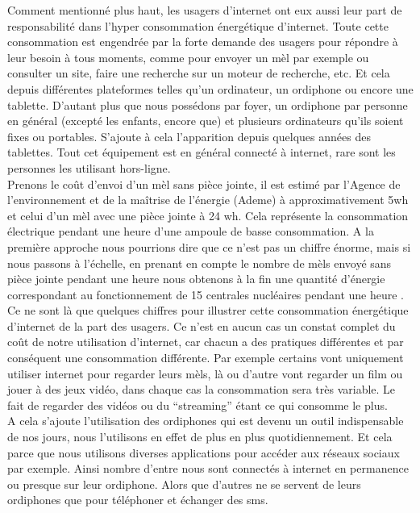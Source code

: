 \documentclass[a4paper,twocolumn,12pt]{article}
\begin{document}
	Comment mentionné plus haut, les usagers d’internet ont eux aussi leur part de responsabilité dans l'hyper consommation énergétique d’internet. Toute cette consommation est engendrée par la forte demande des usagers pour répondre à leur besoin à tous moments, comme pour envoyer un mèl par exemple ou consulter un site, faire une recherche sur un moteur de recherche, etc. Et cela depuis différentes plateformes telles qu’un ordinateur, un ordiphone ou encore une tablette. D'autant plus que nous possédons par foyer, un ordiphone par personne en général (excepté les enfants, encore que) et plusieurs ordinateurs qu’ils soient fixes ou portables. S’ajoute à cela l’apparition depuis quelques années des tablettes. Tout cet équipement est en général connecté à internet, rare sont les personnes les utilisant hors-ligne. \\

	Prenons le coût d'envoi d’un mèl sans pièce jointe, il est estimé par l’Agence de l’environnement et de la maîtrise de l’énergie (Ademe) à approximativement 5wh et celui d'un mèl avec une pièce jointe à 24 wh. Cela représente la consommation électrique pendant une heure d’une ampoule de basse consommation. A la première approche nous pourrions dire que ce n’est pas un chiffre énorme, mais si nous passons à l'échelle, en prenant en compte le nombre de mèls envoyé sans pièce jointe pendant une heure nous obtenons à la fin une quantité d'énergie correspondant au fonctionnement de 15 centrales nucléaires pendant une heure \cite{11}. \\

	Ce ne sont là que quelques chiffres pour illustrer cette consommation énergétique d’internet de la part des usagers. Ce n’est en aucun cas un constat complet du coût de notre utilisation d’internet, car chacun a des pratiques différentes et par conséquent une consommation différente. Par exemple certains vont uniquement utiliser internet pour regarder leurs mèls, là ou d’autre vont regarder un film ou jouer à des jeux vidéo, dans chaque cas la consommation sera très variable. Le fait de regarder des vidéos ou du “streaming” étant ce qui consomme le plus. \\ 

	A cela s’ajoute l’utilisation des ordiphones qui est devenu un outil indispensable de nos jours, nous l'utilisons en effet de plus en plus quotidiennement. Et cela parce que nous utilisons diverses applications pour accéder aux réseaux sociaux par exemple. Ainsi nombre d’entre nous sont connectés à internet en permanence ou presque sur leur ordiphone. Alors que d’autres ne se servent de leurs ordiphones que pour téléphoner et échanger des sms. \\
\end{document}
